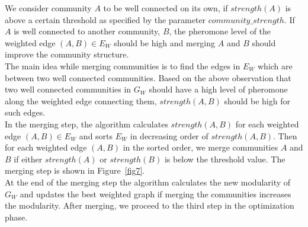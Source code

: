 \begin{spacing}{1.5}
\indent We consider community $A$ to be well connected on its own, if $strength(A)$ is above a certain threshold as specified by the parameter $community\_strength$. If $A$ is well connected to another community, $B$, the pheromone level of the weighted edge $(A, B)\in E_W$ should be high and merging $A$ and $B$ should improve the community structure.\\
\indent The main idea while merging communities is to find the edges in $E_W$ which are between two well connected communities. Based on the above observation that two well connected communities in $G_W$ should have a high level of pheromone along the weighted edge connecting them, $strength(A,B)$ should be high for such edges.\\
\indent In the merging step, the algorithm calculates $strength(A,B)$ for each weighted edge $(A,B)\in E_W$ and sorts $E_W$ in decreasing order of $strength(A,B)$. Then for each weighted edge $(A,B)$ in the sorted order, we merge communities $A$ and $B$ if either $strength(A)$ or $strength(B)$ is below the threshold value. The merging step is shown in Figure~\ref{fig7}.\\
\indent At the end of the merging step the algorithm calculates the new modularity of $G_W$ and updates the best weighted graph if merging the communities increases the modularity. After merging, we proceed to the third step in the optimization phase.

\end{spacing}
